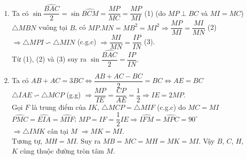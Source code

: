 \begin{ex}
{\begin{enumerate}
        Suy ra $\widehat{IBM}=\widehat{BIM}$
        $\Rightarrow\triangle IMB$ cân tại $M$.\\
        Tương tự, $\Delta IMC$ cân tại $M$.
        \item Ta có $\sin\dfrac{\widehat{BAC}}{2}=\sin\widehat{BCM}=\dfrac{MP}{MC}=\dfrac{MP}{MI}$ (1) (do $MP\perp BC$ và $MI=MC$)\\
        $\triangle MBN$ vuông tại $B$, có $MP.MN=MB^2=MI^2\Rightarrow\dfrac{MP}{MI}=\dfrac{MI}{MN}$ (2)\\
        $\Rightarrow\triangle MPI\backsim\triangle MIN$ (c.g.c)
        $\Rightarrow \dfrac{MI}{MN}=\dfrac{IP}{IN}$ (3).\\
        Từ (1), (2) và (3) suy ra $\sin\dfrac{\widehat{BAC}}{2}=\dfrac{IP}{IN}$.
        \item Ta có $AB+AC=3BC\Leftrightarrow\dfrac{AB+AC-BC}{2}=BC\Leftrightarrow AE=BC$\\
        $\triangle IAE\backsim\triangle MCP$ (g.g) $\Rightarrow\dfrac{MP}{IE}=\dfrac{CP}{AE}=\dfrac{1}{2}\Rightarrow IE=2MP$.\\
        Gọi $F$ là trung điểm của $IK$, $\triangle MCP=\triangle MIF$ (c.g.c) do $MC=MI$\\
        $\widehat{PMC}=\widehat{EIA}=\widehat{MIF}$; $MP=IF=\dfrac{1}{2}IE\Rightarrow \widehat{IFM}=\widehat{MPC}=90^\circ$\\
        $\Rightarrow\triangle IMK$ cân tại $M$ $\Rightarrow MK=MI$.\\
        Tương tự, $MH=MI$. Suy ra $MB=MC=MH=MK=MI$.
        Vậy $B$, $C$, $H$, $K$ cùng thuộc đường tròn tâm $M$. 
    \end{enumerate}
    }
\end{ex}

